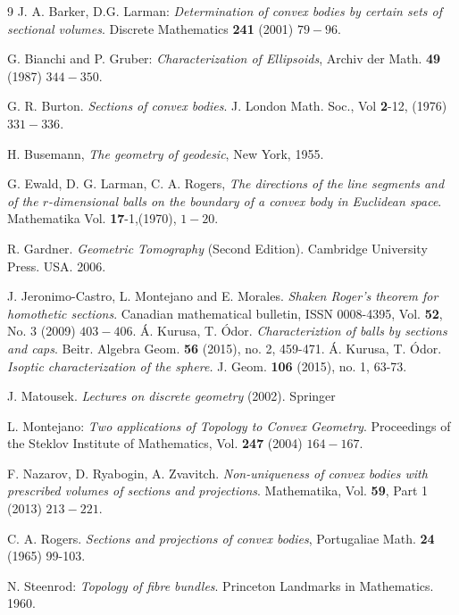 \documentclass[12pt]{amsart}
\begin{document}
\begin{thebibliography}{9}
 J. A. Barker, D.G. Larman: \emph{Determination of convex bodies by certain sets of sectional volumes}. Discrete Mathematics {\bf 241} (2001) $79-96$.

 G. Bianchi and P. Gruber: \emph{Characterization of Ellipsoids},
Archiv der Math. {\bf 49} (1987) $344-350$.

 G. R. Burton. \emph{Sections of convex bodies}. J. London Math. Soc., Vol {\bf 2}-12, (1976) $331-336$.


 H. Busemann, \emph{The geometry of geodesic}, New York, 1955.


 G. Ewald, D. G. Larman, C. A. Rogers, \emph{The directions of the line segments and of the $r$-dimensional balls on the boundary of a convex body in Euclidean space}. Mathematika Vol. {\bf17}-1,(1970), $1-20$.

 R. Gardner. \emph{Geometric Tomography} (Second Edition). Cambridge University Press. USA. 2006. 


 J. Jeronimo-Castro, L. Montejano and E. Morales. \emph{Shaken Roger's theorem for homothetic sections}. Canadian mathematical bulletin, ISSN 0008-4395, Vol. {\bf 52}, No. 3 (2009) $403-406$.
 \'{A}. Kurusa, T. \'{O}dor. \emph{Characteriztion of balls by sections and caps}. Beitr. Algebra Geom. {\bf 56} (2015), no. 2, 459-471.
 \'{A}. Kurusa, T. \'{O}dor. \emph{Isoptic characterization of the sphere.} J. Geom. {\bf 106} (2015), no. 1, 63-73.

 J. Matousek. \emph{Lectures on discrete geometry} (2002). Springer


 L. Montejano: \emph{Two applications of Topology to Convex Geometry}.
Proceedings of the Steklov Institute of Mathematics, Vol. {\bf 247} (2004) $164-167$.

 F. Nazarov, D. Ryabogin, A. Zvavitch.  \emph{Non-uniqueness of convex bodies with prescribed volumes of sections and projections}. Mathematika, Vol. {\bf 59}, Part 1 (2013) $213-221$.

 C. A. Rogers. \emph{Sections and projections of convex bodies}, Portugaliae Math. {\bf 24} (1965) 99-103.


 N. Steenrod: \emph{Topology of fibre bundles}. Princeton Landmarks in Mathematics. 1960.

\end{thebibliography}
\end{document}
